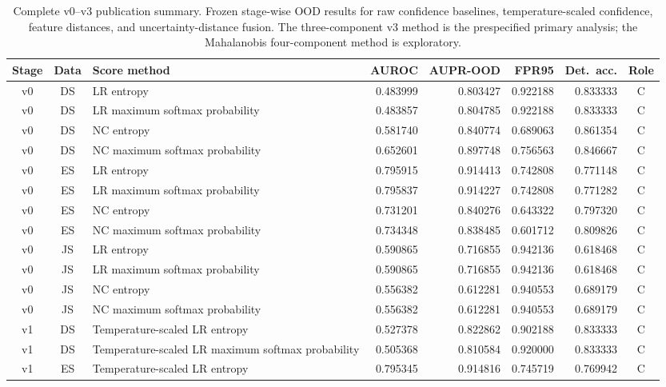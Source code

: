 \begin{table}[H]
  \caption{Complete v0--v3 publication summary. Frozen stage-wise OOD results for raw confidence baselines, temperature-scaled confidence, feature distances, and uncertainty-distance fusion. The three-component v3 method is the prespecified primary analysis; the Mahalanobis four-component method is exploratory.}
  \label{tab:s1-stagewise-summary}
  \centering
  \scriptsize
  \setlength{\tabcolsep}{2.0pt}
  \renewcommand{\arraystretch}{0.92}
  \begin{tabularx}{\textwidth}{@{}c c Y r r r r c@{}}
    \toprule
    Stage & Data & Score method & AUROC & AUPR-OOD & FPR95 & Det.\ acc. & Role \\
    \midrule
    v0 & DS & LR entropy & 0.483999 & 0.803427 & 0.922188 & 0.833333 & C \\
    v0 & DS & LR maximum softmax probability & 0.483857 & 0.804785 & 0.922188 & 0.833333 & C \\
    v0 & DS & NC entropy & 0.581740 & 0.840774 & 0.689063 & 0.861354 & C \\
    v0 & DS & NC maximum softmax probability & 0.652601 & 0.897748 & 0.756563 & 0.846667 & C \\
    v0 & ES & LR entropy & 0.795915 & 0.914413 & 0.742808 & 0.771148 & C \\
    v0 & ES & LR maximum softmax probability & 0.795837 & 0.914227 & 0.742808 & 0.771282 & C \\
    v0 & ES & NC entropy & 0.731201 & 0.840276 & 0.643322 & 0.797320 & C \\
    v0 & ES & NC maximum softmax probability & 0.734348 & 0.838485 & 0.601712 & 0.809826 & C \\
    v0 & JS & LR entropy & 0.590865 & 0.716855 & 0.942136 & 0.618468 & C \\
    v0 & JS & LR maximum softmax probability & 0.590865 & 0.716855 & 0.942136 & 0.618468 & C \\
    v0 & JS & NC entropy & 0.556382 & 0.612281 & 0.940553 & 0.689179 & C \\
    v0 & JS & NC maximum softmax probability & 0.556382 & 0.612281 & 0.940553 & 0.689179 & C \\
    \addlinespace
    v1 & DS & Temperature-scaled LR entropy & 0.527378 & 0.822862 & 0.902188 & 0.833333 & C \\
    v1 & DS & Temperature-scaled LR maximum softmax probability & 0.505368 & 0.810584 & 0.920000 & 0.833333 & C \\
    v1 & ES & Temperature-scaled LR entropy & 0.795345 & 0.914816 & 0.745719 & 0.769942 & C \\

\end{tabularx}
\end{table}
